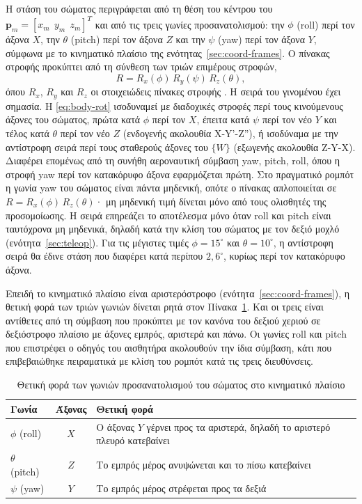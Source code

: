 \documentclass[11pt]{report}
\begin{document}
Η στάση του σώματος περιγράφεται από τη θέση του κέντρου του
$\mathbf{p}_m = [x_m\ \ y_m\ \ z_m]^{T}$ και από τις τρεις γωνίες
προσανατολισμού: την $\phi$ (roll) περί τον άξονα $X$, την $\theta$ (pitch) περί
τον άξονα $Z$ και την $\psi$ (yaw) περί τον άξονα $Y$, σύμφωνα με το κινηματικό
πλαίσιο της ενότητας~\ref{sec:coord-frames}. Ο πίνακας στροφής προκύπτει από τη
σύνθεση των τριών επιμέρους στροφών,
\begin{equation}
R = R_x(\phi)\, R_y(\psi)\, R_z(\theta),
\label{eq:body-rot}
\end{equation}
όπου $R_x$, $R_y$ και $R_z$ οι στοιχειώδεις πίνακες στροφής
\cite{siciliano_robotics_2009}. Η σειρά του γινομένου έχει σημασία. Η
\eqref{eq:body-rot} ισοδυναμεί με διαδοχικές στροφές περί τους κινούμενους
άξονες του σώματος, πρώτα κατά $\phi$ περί τον $X$, έπειτα κατά $\psi$ περί τον
νέο $Y$ και τέλος κατά $\theta$ περί τον νέο $Z$ (ενδογενής ακολουθία
X-Y'-Z''), ή ισοδύναμα με την αντίστροφη σειρά περί τους σταθερούς άξονες του
$\{W\}$ (εξωγενής ακολουθία Z-Y-X). Διαφέρει επομένως από τη συνήθη
αεροναυτική σύμβαση yaw, pitch, roll, όπου η στροφή yaw περί τον κατακόρυφο
άξονα εφαρμόζεται πρώτη. Στο πραγματικό ρομπότ η γωνία yaw του σώματος είναι
πάντα μηδενική, οπότε ο πίνακας απλοποιείται σε $R = R_x(\phi)\,R_z(\theta)$·
μη μηδενική τιμή δίνεται μόνο από τους ολισθητές της προσομοίωσης. Η σειρά
επηρεάζει το αποτέλεσμα μόνο όταν roll και pitch είναι ταυτόχρονα μη μηδενικά,
δηλαδή κατά την κλίση του σώματος με τον δεξιό μοχλό
(ενότητα~\ref{sec:teleop}). Για τις μέγιστες τιμές $\phi = 15^\circ$ και
$\theta = 10^\circ$, η αντίστροφη σειρά θα έδινε στάση που διαφέρει κατά
περίπου $2{,}6^\circ$, κυρίως περί τον κατακόρυφο άξονα.

Επειδή το κινηματικό πλαίσιο είναι αριστερόστροφο
(ενότητα~\ref{sec:coord-frames}), η θετική φορά των τριών γωνιών δίνεται
ρητά στον Πίνακα~\ref{tab:rpy-signs}. Και οι τρεις είναι αντίθετες από τη
σύμβαση που προκύπτει με τον κανόνα του δεξιού χεριού σε δεξιόστροφο πλαίσιο με
άξονες εμπρός, αριστερά και πάνω. Οι γωνίες roll και pitch που επιστρέφει ο
οδηγός του αισθητήρα ακολουθούν την ίδια σύμβαση, κάτι που επιβεβαιώθηκε
πειραματικά με κλίση του ρομπότ κατά τις τρεις διευθύνσεις.

\begin{table}[htbp]
    \centering
    \small
    \begin{tabular}{@{}l c p{8.6cm}@{}}
        \toprule
        Γωνία & Άξονας & Θετική φορά \\
        \midrule
        $\phi$ (roll) & $X$ & Ο άξονας $Y$ γέρνει προς τα αριστερά, δηλαδή το αριστερό πλευρό κατεβαίνει \\
        $\theta$ (pitch) & $Z$ & Το εμπρός μέρος ανυψώνεται και το πίσω κατεβαίνει \\
        $\psi$ (yaw) & $Y$ & Το εμπρός μέρος στρέφεται προς τα δεξιά \\
        \bottomrule
    \end{tabular}
    \caption[Θετική φορά των γωνιών προσανατολισμού]{Θετική φορά των γωνιών
    προσανατολισμού του σώματος στο κινηματικό πλαίσιο}
    \label{tab:rpy-signs}
\end{table}
\end{document}
